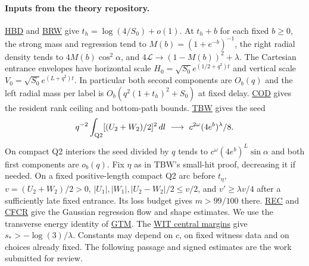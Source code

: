 \documentclass[11pt]{article}
\newcommand{\dd}{\,dl}
\newcommand{\Ll}{\mathcal L}
\newcommand{\repo}{https://github.com/TodManlaibaatar/OOD-reversals-theory/blob/12aa3b6f48f83a097600bcf9b44d93399e2f9697}
\newcommand{\src}[2]{\href{\repo/09_canonical_regime_AN04/AN04_#1_v1.tex}{#2}}
\begin{document}
\paragraph{Inputs from the theory repository.}
\src{trained_half_mass_bridge_donors}{HBD} and \src{bridge_return_before_weak_learning}{BRW}
give $t_h=\log(4/S_0)+o(1)$. At $t_h+b$ for each fixed $b\ge0$, the strong mass and regression tend to $M(b)=(1+e^{-b})^{-1}$, the right radial density tends to $4M(b)\cos^2\alpha$, and $4\Ll\to (1-M(b))^2+\lambda$. The Cartesian entrance envelopes have horizontal scale $H_0=\sqrt{S_0}e^{(1/2+q^2)t}$ and vertical scale $V_0=\sqrt{S_0}e^{(L+q^2)t}$. In particular both second components are $O_b(q)$ and the left radial mass per label is $O_b(q^2(1+t_h)^2+S_0)$ at fixed delay.
\src{core_output_descent}{COD} gives the resident rank ceiling and bottom-path bounds.
\src{transverse_balance_and_weak_clock}{TBW} gives the seed
\[
 q^{-2}\int_{\rm Q2}[(U_2+W_2)/2]^2\dd\ \longrightarrow\ c^{2\omega}(4e^b)^\lambda/8 .
\]
On compact Q2 interiors the seed divided by $q$ tends to $c^\omega(4e^b)^L\sin\alpha$ and both first components are $o_b(q)$. Fix $\eta$ as in TBW's small-hit proof, decreasing it if needed. On a fixed positive-length compact Q2 arc before $t_\eta$, $v=(U_2+W_2)/2>0$, $|U_1|,|W_1|,|U_2-W_2|/2\le v/2$, and $v'\ge\lambda v/4$ after a sufficiently late fixed entrance. Its loss budget gives $m>99/100$ there.
\src{residual_exchange_channels}{REC} and \src{cap_free_cross_response}{CFCR} give the Gaussian regression flow and shape estimates. We use the transverse energy identity of \src{gate_transport_and_transverse_memory}{GTM}. The \href{\repo/04_witnesses_persistence/AN06_learned_orbit_witnesses_v2.tex}{WIT central margins} give $s_*>-\log(3)/\lambda$. Constants may depend on $c$, on fixed witness data and on choices already fixed. The following passage and signed estimates are the work submitted for review.
\end{document}
